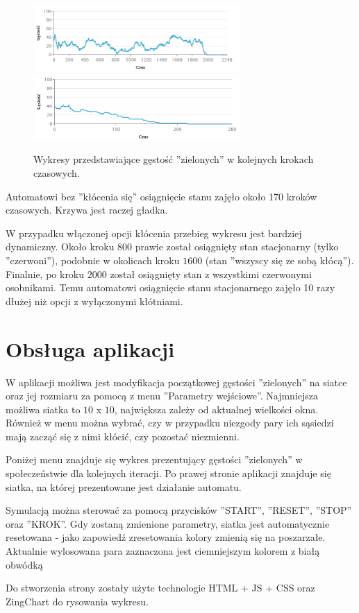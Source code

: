 \documentclass[12pt]{article}
\begin{document}
\begin{figure}[H]
\centering
\includegraphics[width=0.7\textwidth]{stacjonarny_niezgoda_wykres.png} 
\includegraphics[width=0.7\textwidth]{stacjonarny_niezgoda_wykres_bezk.png}
\caption{Wykresy przedstawiające gęstość ''zielonych'' w kolejnych krokach czasowych.}
\end{figure}

Automatowi bez ''kłócenia się'' osiągnięcie stanu zajęło około 170 kroków czasowych. Krzywa jest raczej gładka.

W przypadku włączonej opcji kłócenia przebieg wykresu jest bardziej dynamiczny. Około kroku $800$ prawie został osiągnięty stan stacjonarny (tylko ''czerwoni''), podobnie w okolicach kroku $1600$ (stan ''wszyscy się ze sobą kłócą''). Finalnie, po kroku $2000$ został osiągnięty stan z wszystkimi czerwonymi osobnikami. Temu automatowi osiągnięcie stanu stacjonarnego zajęło 10 razy dłużej niż opcji z wyłączonymi kłótniami.

\section{Obsługa aplikacji}
W aplikacji możliwa jest modyfikacja początkowej gęstości ''zielonych'' na siatce oraz jej rozmiaru za pomocą z menu ''Parametry wejściowe''. Najmniejsza możliwa siatka to $10$ x $10$, największa zależy od aktualnej wielkości okna. Również w menu można wybrać, czy w przypadku niezgody pary ich sąsiedzi mają zacząć się z nimi kłócić, czy pozostać niezmienni.

Poniżej menu znajduje się wykres prezentujący gęstości ''zielonych'' w społeczeństwie dla kolejnych iteracji. Po prawej stronie aplikacji znajduje się siatka, na której prezentowane jest działanie automatu.

Symulacją można sterować za pomocą przycisków ''START'', ''RESET'', ''STOP'' oraz ''KROK''. Gdy zostaną zmienione parametry, siatka jest automatycznie resetowana - jako zapowiedź zresetowania kolory zmienią się na poszarzałe. Aktualnie wylosowana para zaznaczona jest ciemniejszym kolorem z białą obwódką

Do stworzenia strony zostały użyte technologie HTML + JS + CSS oraz ZingChart do rysowania wykresu.
\end{document}
